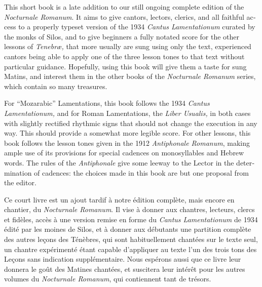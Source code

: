 \documentclass[11pt, twoside, french]{book}
\begin{document}
\begin{english}
	

{\setlength{\parindent}{5mm}\small

This short book is a late addition to our still ongoing complete edition of the \emph{Nocturnale Romanum}. 
It aims to give cantors, lectors, clerics, and all faithful access to a properly typeset version of the 1934 \emph{Cantus Lamentationum} curated by the monks of Silos, 
and to give beginners a fully notated score for the other lessons of \emph{Tenebræ,} that more usually are sung using only the text, experienced cantors being able
to apply one of the three lesson tones to that text without particular guidance. Hopefully, using this book will give them a taste for sung Matins, and interest them in the other books of the \emph{Nocturnale Romanum} series, which contain so many treasures.
}

{\setlength{\parindent}{5mm}\small

For “Mozarabic” Lamentations, this book follows the 1934 \emph{Cantus Lamentationum,} and for Roman Lamentations, the \emph{Liber Usualis,} in both cases with slightly rectified rhythmic signs that should not change the execution in any way. This should provide a somewhat more legible score.
For other lessons, this book follows the lesson tones given in the 1912 \emph{Antiphonale Romanum}, making ample use of its provisions for special cadences on monosyllables and Hebrew words. The rules of the \emph{Antiphonale} give some leeway to the Lector in the determination of cadences: the choices made in this book are but one proposal from the editor.
}

\end{english}

\vfill
\null

\newpage

\vspace*{1.5cm}


{\setlength{\parindent}{5mm}\small

Ce court livre est un ajout tardif à notre édition complète, mais encore en chantier, du \emph{Nocturnale Romanum}.
Il vise à donner aux chantres, lecteurs, clercs et fidèles, accès à une version remise en forme du \emph{Cantus Lamentationum} de 1934 édité par les moines de Silos,
et à donner aux débutants une partition complète des autres leçons des Ténèbres, qui sont habituellement chantées sur le texte seul, un chantre expérimenté
étant capable d'appliquer au texte l'un des trois tons des Leçons sans indication supplémentaire. Nous espérons aussi que ce livre leur donnera le goût 
des Matines chantées, et suscitera leur intérêt pour les autres volumes du \emph{Nocturnale Romanum}, qui contiennent tant de trésors.
}
\end{document}
